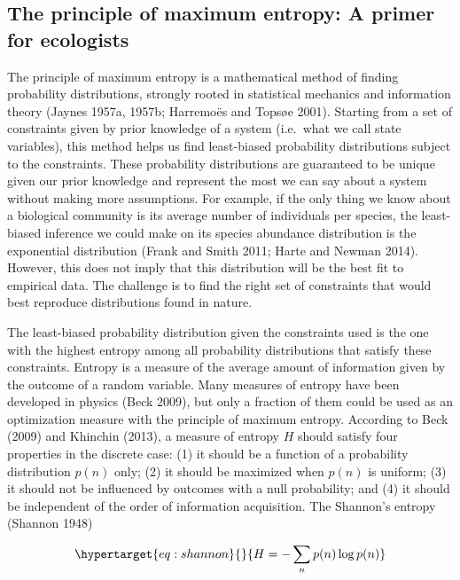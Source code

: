 \documentclass[11pt]{article}
\begin{document}
\hypertarget{the-principle-of-maximum-entropy-a-primer-for-ecologists}{%
\subsection{The principle of maximum entropy: A primer for
ecologists}\label{the-principle-of-maximum-entropy-a-primer-for-ecologists}}

The principle of maximum entropy is a mathematical method of finding
probability distributions, strongly rooted in statistical mechanics and
information theory (Jaynes 1957a, 1957b; Harremoës and Topsøe 2001).
Starting from a set of constraints given by prior knowledge of a system
(i.e.~what we call state variables), this method helps us find
least-biased probability distributions subject to the constraints. These
probability distributions are guaranteed to be unique given our prior
knowledge and represent the most we can say about a system without
making more assumptions. For example, if the only thing we know about a
biological community is its average number of individuals per species,
the least-biased inference we could make on its species abundance
distribution is the exponential distribution (Frank and Smith 2011;
Harte and Newman 2014). However, this does not imply that this
distribution will be the best fit to empirical data. The challenge is to
find the right set of constraints that would best reproduce
distributions found in nature.

The least-biased probability distribution given the constraints used is
the one with the highest entropy among all probability distributions
that satisfy these constraints. Entropy is a measure of the average
amount of information given by the outcome of a random variable. Many
measures of entropy have been developed in physics (Beck 2009), but only
a fraction of them could be used as an optimization measure with the
principle of maximum entropy. According to Beck (2009) and Khinchin
(2013), a measure of entropy \(H\) should satisfy four properties in the
discrete case: (1) it should be a function of a probability distribution
\(p(n)\) only; (2) it should be maximized when \(p(n)\) is uniform; (3)
it should not be influenced by outcomes with a null probability; and (4)
it should be independent of the order of information acquisition. The
Shannon's entropy (Shannon 1948)

\begin{equation}\protect\hypertarget{eq:shannon}{}{H = -\sum_{n} p(n) \log p(n)}\label{eq:shannon}\end{equation}
\end{document}
